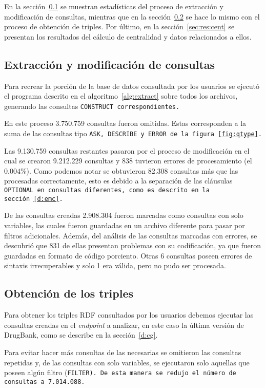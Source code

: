 En la sección~\ref{sec:res:extr} se muestran estadísticas del proceso de
extracción y modificación de consultas, mientras que en la
sección~\ref{sec:res:obt} se hace lo mismo con el proceso de obtención de
triples.
Por último, en la sección~\ref{sec:res:cent} se presentan los resultados del
cálculo de centralidad y datos relacionados a ellos.

\subsection{Extracción y modificación de consultas}\label{sec:res:extr}
Para recrear la porción de la base de datos consultada por los usuarios se
ejecutó el programa descrito en el algoritmo~\ref{alg:extract} sobre todos los
archivos, generando las consultas \tt{CONSTRUCT} correspondientes.

En este proceso 3.750.759 consultas fueron omitidas. Estas corresponden a la
suma de las consultas tipo \tt{ASK}, \tt{DESCRIBE} y \tt{ERROR} de la
figura~\ref{fig:qtype}.

Las 9.130.759 consultas restantes pasaron por el proceso de modificación en el
cual se crearon 9.212.229 consultas y 838 tuvieron errores de procesamiento
(el $0.004\%$).
Como podemos notar se obtuvieron 82.308 consultas más que las procesadas
correctamente, esto es debido a la separación de las cláusulas \tt{OPTIONAL} en
consultas diferentes, como es descrito en la sección~\ref{d:emc}.

De las consultas creadas 2.908.304 fueron marcadas como consultas con solo
variables, las cuales fueron guardadas en un archivo diferente para pasar por
filtros adicionales. 
Además, del análisis de las consultas marcadas con errores, se descubrió que
831 de ellas presentan problemas con su codificación, ya que fueron guardadas en
formato de código porciento. Otras 6 consultas poseen errores de sintaxis
irrecuperables y solo 1 era válida, pero no pudo ser procesada.

\subsection{Obtención de los triples}\label{sec:res:obt}
Para obtener los triples RDF consultados por los usuarios debemos ejecutar las
consultas creadas en el \emph{endpoint} a analizar, en este caso la última
versión de DrugBank, como se describe en la sección~\ref{d:cg}.

Para evitar hacer más consultas de las necesarias se omitieron las consultas
repetidas y, de las consultas con solo variables, se ejecutaron solo aquellas
que poseen algún filtro (\tt{FILTER}). De esta manera se redujo el número de
consultas a 7.014.088.

